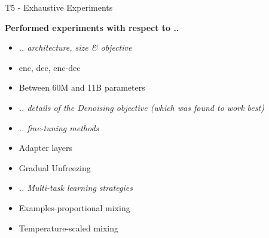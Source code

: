 
\begin{frame}{T5 - Exhaustive Experiments}

\vfill

	\textbf{Performed experiments with respect to ..}
	
	\begin{itemize}
		\item \textit{.. architecture, size \& objective}
		\item[$\to$] enc, dec, enc-dec
		\item[$\to$] Between 60M and 11B parameters
		\item \textit{.. details of the Denoising objective (which was found to work best)}
		\item \textit{.. fine-tuning methods}
		\item[$\to$] Adapter layers
		\item[$\to$] Gradual Unfreezing
		\item \textit{.. Multi-task learning strategies}
		\item[$\to$] Examples-proportional mixing
		\item[$\to$] Temperature-scaled mixing
	\end{itemize}
	
\vfill

\end{frame}


